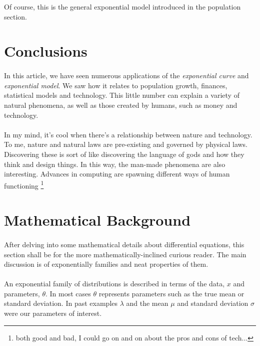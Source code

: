 \documentclass{cup-pan}
\begin{document}
Of course, this is the general exponential model introduced in the population section.

\section{Conclusions}
\paragraph{}
In this article, we have seen numerous applications of the \textit{exponential curve} and \textit{exponential model}. We saw how it relates to population growth, finances, statistical models and technology. This little number can explain a variety of natural phenomena, as well as those created by humans, such as money and technology.

\paragraph{}
 In my mind, it's cool when there's a relationship between nature and technology. To me, nature and natural laws are pre-existing and governed by physical laws. Discovering these is sort of like discovering the language of gods and how they think and design things. In this way, the man-made phenomena are also interesting. Advances in computing are spawning different ways of human functioning \footnote{both good and bad, I could go on and on about the pros and cons of tech...}

\section{Mathematical Background}
\label{sec:math}

\paragraph{}
After delving into some mathematical details about differential equations, this section shall be for the more mathematically-inclined curious reader. The main discussion is of exponentially families and neat properties of them.

\paragraph{} An exponential family of distributions is described in terms of the data, $x$ and parameters, $\theta$. In most cases $\theta$ represents parameters such as the true mean or standard deviation. In past examples $\lambda$ and the mean $\mu$ and standard deviation $\sigma$ were our parameters of interest.
\end{document}
